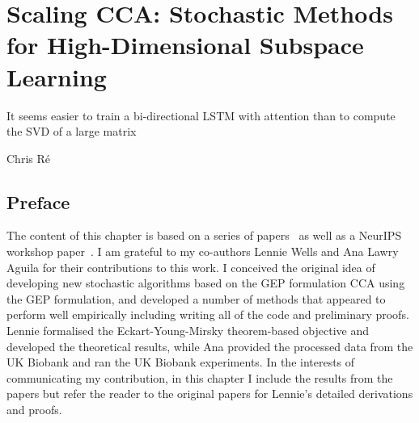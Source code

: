 \graphicspath{{chapters/gradient_descent/}}


\chapter{Scaling CCA: Stochastic Methods for High-Dimensional Subspace Learning}\label{ch:gradient_descent}
\epigraph{It seems easier to train a bi-directional LSTM with attention than to compute the SVD of a large matrix}{Chris Ré}\citep{gemp2021}
\minitoc
\section*{Preface}
The content of this chapter is based on a series of papers~\citep{chapman2022generalized, chapman2023efficient} as well as a NeurIPS workshop paper~\citep{chapman2023cca}.
I am grateful to my co-authors Lennie Wells and Ana Lawry Aguila for their contributions to this work.
I conceived the original idea of developing new stochastic algorithms based on the GEP formulation CCA using the GEP formulation, and developed a number of methods that appeared to perform well empirically including writing all of the code and preliminary proofs. 
Lennie formalised the Eckart-Young-Mirsky theorem-based objective and developed the theoretical results, while Ana provided the processed data from the UK Biobank and ran the UK Biobank experiments.
In the interests of communicating my contribution, in this chapter I include the results from the papers but refer the reader to the original papers for Lennie's detailed derivations and proofs.


